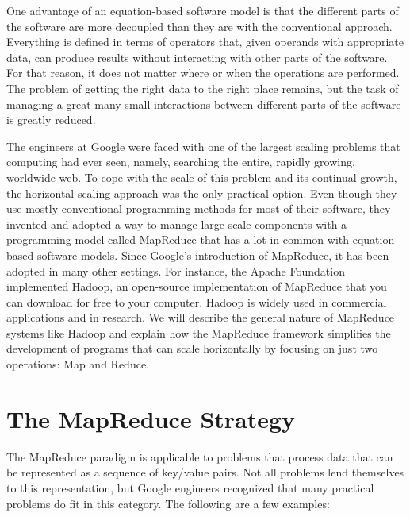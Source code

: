 One advantage of an equation-based software model
is that the different parts of the software are more decoupled
than they are with the conventional approach.
Everything is defined in terms of operators
that, given operands with appropriate data,
can produce results without
interacting with other parts of the software.
For that reason, it does not matter where or when
the operations are performed.
The problem of getting the right data to the right place
remains, but the task of managing a great many small interactions
between different parts of the software is greatly reduced.

The engineers at Google were faced with one of the largest
scaling problems that computing had ever seen,
namely, searching the entire, rapidly growing, worldwide web.
To cope with the scale of this problem and its continual growth,
the horizontal scaling approach was the only practical option.
Even though they use mostly conventional programming methods
for most of their software,
they invented and adopted a way to manage large-scale components
with a programming model called MapReduce
that has a lot in common with equation-based software models.
Since Google's introduction of MapReduce,
it has been adopted in many other settings.  For
instance, the Apache Foundation
implemented Hadoop, an
open-source implementation of MapReduce that you can
download for free to your computer.
Hadoop is widely used in commercial applications and in research.
We will describe the general nature of
MapReduce systems like Hadoop
and explain how the MapReduce framework simplifies the
development of programs that can scale horizontally by
focusing on just two operations: Map and Reduce.

\section{The MapReduce Strategy}

The \textsf{MapReduce} paradigm
is applicable to problems that process
data that can be represented as a sequence of
key/value pairs.
Not all problems lend themselves to this representation,
but Google engineers recognized that many practical
problems do fit in this category.
The following are a few examples:

